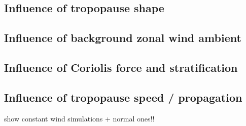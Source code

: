 \subsection{Influence of tropopause shape}

\subsection{Influence of background zonal wind ambient}

\subsection{Influence of Coriolis force and stratification}

\subsection{Influence of tropopause speed / propagation}

show constant wind simulations + normal ones!!
